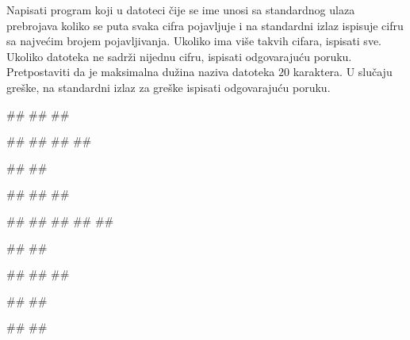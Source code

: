 \begin{Exercise}[label=p3_id14]         
Napisati program koji u datoteci čije se ime unosi sa standardnog ulaza prebrojava
koliko se puta svaka cifra pojavljuje i na standardni izlaz ispisuje cifru sa najvećim brojem pojavljivanja. 
Ukoliko ima više takvih cifara, ispisati sve. Ukoliko datoteka ne sadrži nijednu cifru, ispisati odgovarajuću
poruku. 
Pretpostaviti da je maksimalna dužina naziva datoteka $20$ karaktera.
U slučaju greške, na standardni izlaz za greške ispisati odgovarajuću poruku.

\begin{minitest}
\begin{upotreba}{1}
#\naslovInt#
##
##

##
##
##
##

#\naslovIzlaz#
##
\end{upotreba}
\end{minitest}
\begin{minitest}
\begin{upotreba}{2}
#\naslovInt#
##
##

##
##
##
##
##

#\naslovIzlaz#
##
\end{upotreba}
\end{minitest}
\begin{minitest}
\begin{upotreba}{3}
#\naslovInt#
##
##

##
##

#\naslovIzlaz#
##
\end{upotreba}
\end{minitest}
\end{Exercise}
\begin{Answer}[ref=p3_id14]
\end{Answer}



